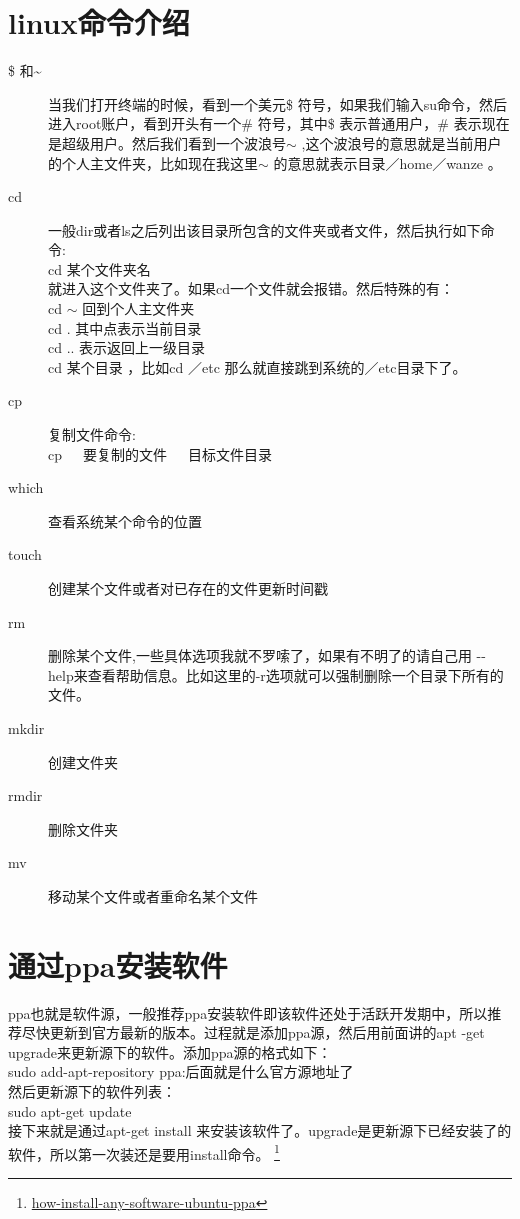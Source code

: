\documentclass[11pt,oneside]{book}
\begin{document}
\begin{common-format}
\section{linux命令介绍}
\begin{description}
\item[ \${} 和\~{}] 当我们打开终端的时候，看到一个美元\$ 符号，如果我们输入su命令，然后进入root账户，看到开头有一个\#{} 符号，其中\$ 表示普通用户，\#{} 表示现在是超级用户。然后我们看到一个波浪号$\sim$  ,这个波浪号的意思就是当前用户的个人主文件夹，比如现在我这里$\sim$ 的意思就表示目录／home／wanze 。
\item[ cd] 一般dir或者ls之后列出该目录所包含的文件夹或者文件，然后执行如下命令:\\cd 某个文件夹名 \\ 就进入这个文件夹了。如果cd一个文件就会报错。然后特殊的有：\\ cd $\sim$ 回到个人主文件夹\\cd . 其中点表示当前目录\\cd .. 表示返回上一级目录\\cd 某个目录 ，比如cd ／etc 那么就直接跳到系统的／etc目录下了。
\item[ cp] 复制文件命令:\\ cp~~~要复制的文件~~~目标文件目录 
\item[ which] 查看系统某个命令的位置
\item[ touch] 创建某个文件或者对已存在的文件更新时间戳
\item[ rm ]删除某个文件,一些具体选项我就不罗嗦了，如果有不明了的请自己用 -{}- help来查看帮助信息。比如这里的-r选项就可以强制删除一个目录下所有的文件。
\item[ mkdir] 创建文件夹


\item[ rmdir] 删除文件夹
\item[ mv ]移动某个文件或者重命名某个文件
\end{description}

\section{通过ppa安装软件}
ppa也就是软件源，一般推荐ppa安装软件即该软件还处于活跃开发期中，所以推荐尽快更新到官方最新的版本。过程就是添加ppa源，然后用前面讲的apt -get upgrade来更新源下的软件。添加ppa源的格式如下：\\
sudo add-apt-repository ppa:后面就是什么官方源地址了\\
然后更新源下的软件列表：\\
sudo apt-get update\\
接下来就是通过apt-get  install 来安装该软件了。upgrade是更新源下已经安装了的软件，所以第一次装还是要用install命令。
\footnote{\href{http://linuxers.org/howto/how-install-any-software-ubuntu-ppa}{how-install-any-software-ubuntu-ppa}}


\end{common-format}
\end{document}
